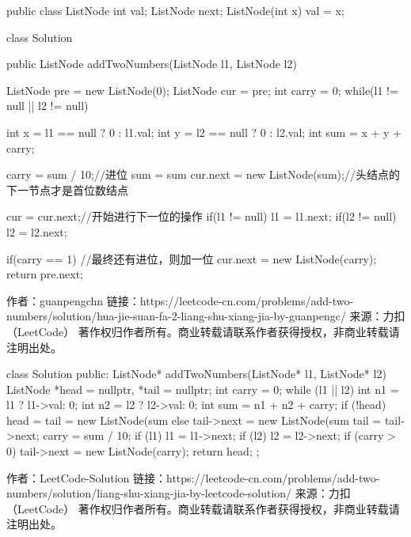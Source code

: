 
  public class ListNode {
      int val;
      ListNode next;
      ListNode(int x) { val = x; }
  }
 
class Solution {
    public ListNode addTwoNumbers(ListNode l1, ListNode l2) {
        ListNode pre = new ListNode(0);
        ListNode cur = pre;
        int carry = 0;
        while(l1 != null || l2 != null) {
            int x = l1 == null ? 0 : l1.val;
            int y = l2 == null ? 0 : l2.val;
            int sum = x + y + carry;
            
            carry = sum / 10;//进位
            sum = sum %
            cur.next = new ListNode(sum);//头结点的下一节点才是首位数结点

            cur = cur.next;//开始进行下一位的操作
            if(l1 != null)
                l1 = l1.next;
            if(l2 != null)
                l2 = l2.next;
        }
        if(carry == 1) {//最终还有进位，则加一位
            cur.next = new ListNode(carry);
        }
        return pre.next;
    }
}

作者：guanpengchn
链接：https://leetcode-cn.com/problems/add-two-numbers/solution/hua-jie-suan-fa-2-liang-shu-xiang-jia-by-guanpengc/
来源：力扣（LeetCode）
著作权归作者所有。商业转载请联系作者获得授权，非商业转载请注明出处。

class Solution {
public:
    ListNode* addTwoNumbers(ListNode* l1, ListNode* l2) {
        ListNode *head = nullptr, *tail = nullptr;
        int carry = 0;
        while (l1 || l2) {
            int n1 = l1 ? l1->val: 0;
            int n2 = l2 ? l2->val: 0;
            int sum = n1 + n2 + carry;
            if (!head) {
                head = tail = new ListNode(sum %
            } else {
                tail->next = new ListNode(sum %
                tail = tail->next;
            }
            carry = sum / 10;
            if (l1) {
                l1 = l1->next;
            }
            if (l2) {
                l2 = l2->next;
            }
        }
        if (carry > 0) {
            tail->next = new ListNode(carry);
        }
        return head;
    }
};

作者：LeetCode-Solution
链接：https://leetcode-cn.com/problems/add-two-numbers/solution/liang-shu-xiang-jia-by-leetcode-solution/
来源：力扣（LeetCode）
著作权归作者所有。商业转载请联系作者获得授权，非商业转载请注明出处。